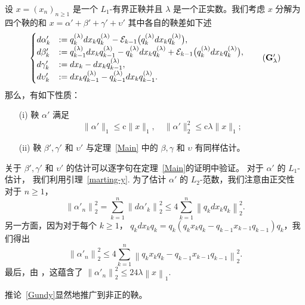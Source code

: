 \begin{corollary} \label{Gundy}
设 $x=(x_n)_{n \ge 1}$ 是一个 $L_1$-有界正鞅并且
$\lambda$ 是一个正实数。我们考虑 $x$ 分解为四个鞅的和 $x= \alpha' +
\beta' + \gamma' + \upsilon'$ 其中各自的鞅差如下述
\begin{equation*}\label{Decomposition2}
\begin{cases}
 d\alpha'_k &:= q_k^{(\lambda)} dx_k q_k^{(\lambda)} -
\E_{k-1} \big( q_k^{(\lambda)} dx_k q_k^{(\lambda)} \big), \\
d\beta'_k &:= q_{k-1}^{(\lambda)} dx_k q_{k-1}^{(\lambda)} -
q_k^{(\lambda)} dx_k q_k^{(\lambda)} + \E_{k-1} \big(
q_k^{(\lambda)} dx_k q_k^{(\lambda)} \big), \\ d\gamma'_k &:= dx_k
- dx_k q_{k-1}^{(\lambda)},\\ d\upsilon'_k &:= dx_k
q_{k-1}^{(\lambda)} - q_{k-1}^{(\lambda)} dx_k
q_{k-1}^{(\lambda)}.
\end{cases} \tag{$\mathbf{G}'_{\lambda}$}
\end{equation*}
那么，有如下性质：
\begin{itemize}
\item[(i)] 鞅 $\alpha'$ 满足 $$\|\alpha'\|_1 \le
\mathrm{c} \|x\|_1, \quad \|\alpha'\|_2^2 \leq \mathrm{c}
\lambda\|x\|_1;$$
\item[(ii)] 鞅 $\beta', \gamma'$ 和 $\upsilon'$
与定理~\ref{Main} 中的 $\beta, \gamma$ 和 $\upsilon$ 有同样估计。
\end{itemize}
\end{corollary}

\dem 关于 $\beta', \gamma'$ 和 $\upsilon'$ 的估计可以逐字句在定理~\ref{Main}的证明中验证。 对于 $\alpha'$ 的
$L_1$-估计， 我们利用引理~\ref{marting-y}. 为了估计  $\alpha'$ 的 $L_2$-范数，我们注意由正交性
对于 $n\geq 1$，
\begin{equation*}
\left\|\alpha'_n\right\|_2^2
=\sum_{k=1}^n\left\|d\alpha'_k\right\|_2^2 \leq 4\sum_{k=1}^n
\left\|q_kdx_kq_k\right\|_2^2.
\end{equation*}
另一方面，因为对于每个 $k\geq 1$，
$q_kdx_kq_k=q_k(q_kx_kq_k -q_{k-1}x_{k-1}q_{k-1})q_k$，我们得出
\begin{equation*}
\left\|\alpha'_n\right\|_2^2 \leq 4 \sum_{k=1}^n \left\|q_k x_kq_k
-q_{k-1}x_{k-1}q_{k-1}\right\|_2^2.
\end{equation*}
最后，由 \cite[Lemma~3.4]{R}，这蕴含了
$\left\|\alpha'_n \right\|_2^2 \leq 24\lambda\left\|x\right\|_1.$
\fin

\begin{remark}
推论~\ref{Gundy}显然地推广到非正的鞅。
\end{remark}

